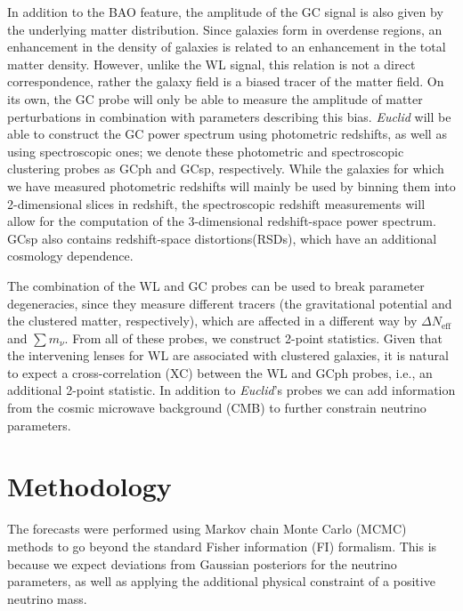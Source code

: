 \documentclass[a4paper,11pt]{article}
\newcommand{\euclid}{\textit{Euclid}\xspace}
\newcommand{\dneff}{\Delta N_\mathrm{eff}}
\newcommand{\summnu}{\sum m_\nu}
\begin{document}
In addition to the BAO feature, the amplitude of the GC signal is also given by the underlying matter distribution. Since galaxies form in overdense regions, an enhancement in the density of galaxies is related to an enhancement in the total matter density. However, unlike the WL signal, this relation is not a direct correspondence, rather the galaxy field is a biased tracer of the matter field. On its own, the GC probe will only be able to measure the amplitude of matter perturbations in combination with parameters describing this bias.  \euclid will be able to construct the GC power spectrum using photometric redshifts, as well as using spectroscopic ones; we denote these photometric and spectroscopic clustering probes as GCph and GCsp, respectively. While the galaxies for which we have measured photometric redshifts will mainly be used by binning them into 2-dimensional slices in redshift, the spectroscopic redshift measurements will allow for the computation of the 3-dimensional redshift-space power spectrum. GCsp also contains redshift-space distortions(RSDs), which have an additional cosmology dependence. 

The combination of the WL and GC probes can be used to break parameter degeneracies, since they measure different tracers (the gravitational potential and the clustered matter, respectively), which are affected in a different way by $\dneff$ and $\summnu$. From all of these probes, we construct 2-point statistics. Given that the intervening lenses for WL are associated with clustered galaxies, it is natural to expect a cross-correlation (XC) between the WL and GCph probes, i.e., an additional 2-point statistic.  In addition to \euclid's probes
we can add information from the cosmic microwave background (CMB) to further constrain neutrino parameters.

\section{Methodology}

The forecasts were performed using Markov chain Monte Carlo (MCMC) methods to go beyond the standard Fisher information (FI) formalism. This is because we expect deviations from Gaussian posteriors for the neutrino parameters, as well as applying the additional physical constraint of a positive neutrino mass.
\end{document}
